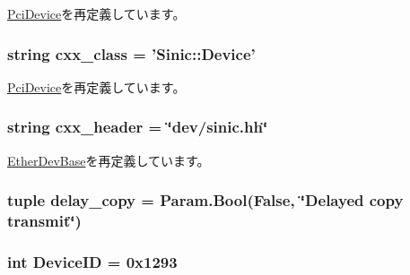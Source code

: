 \hyperlink{classPci_1_1PciDevice_a9222bb7cddf99c695b0430f560974967}{PciDevice}を再定義しています。\hypertarget{classEthernet_1_1Sinic_a58cd55cd4023648e138237cfc0822ae3}{
\subsubsection[{cxx\_\-class}]{\setlength{\rightskip}{0pt plus 5cm}string {\bf cxx\_\-class} = '{\bf Sinic::Device}'}}
\label{classEthernet_1_1Sinic_a58cd55cd4023648e138237cfc0822ae3}


\hyperlink{classPci_1_1PciDevice_a58cd55cd4023648e138237cfc0822ae3}{PciDevice}を再定義しています。\hypertarget{classEthernet_1_1Sinic_a17da7064bc5c518791f0c891eff05fda}{
\subsubsection[{cxx\_\-header}]{\setlength{\rightskip}{0pt plus 5cm}string {\bf cxx\_\-header} = \char`\"{}dev/sinic.hh\char`\"{}}}
\label{classEthernet_1_1Sinic_a17da7064bc5c518791f0c891eff05fda}


\hyperlink{classEthernet_1_1EtherDevBase_a17da7064bc5c518791f0c891eff05fda}{EtherDevBase}を再定義しています。\hypertarget{classEthernet_1_1Sinic_a8347994076e01ff1f8ded0b2195c978d}{
\subsubsection[{delay\_\-copy}]{\setlength{\rightskip}{0pt plus 5cm}tuple {\bf delay\_\-copy} = Param.Bool(False, \char`\"{}Delayed copy transmit\char`\"{})}}
\label{classEthernet_1_1Sinic_a8347994076e01ff1f8ded0b2195c978d}
\hypertarget{classEthernet_1_1Sinic_a4a8ed9a0233fc6d0ce178569c4de25d0}{
\subsubsection[{DeviceID}]{\setlength{\rightskip}{0pt plus 5cm}int {\bf DeviceID} = 0x1293}}
\label{classEthernet_1_1Sinic_a4a8ed9a0233fc6d0ce178569c4de25d0}


